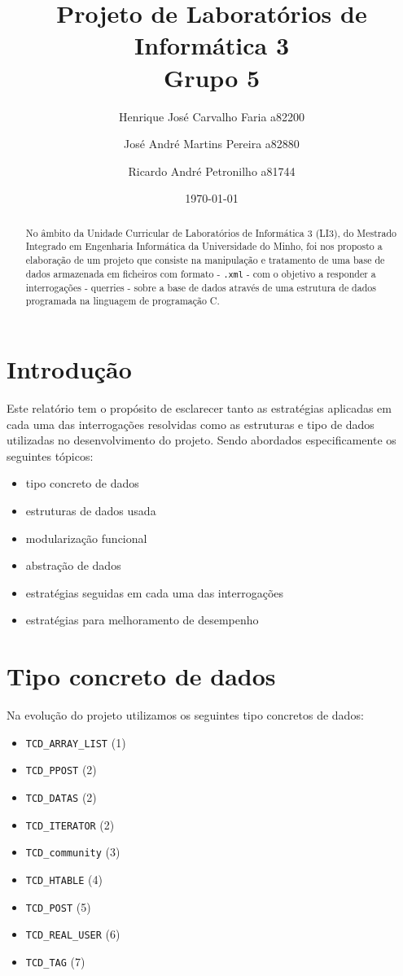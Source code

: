 \documentclass[4apaper]{report}
\title{Projeto de Laboratórios de Informática 3\\Grupo 5}
\author{Henrique José Carvalho Faria a82200\and José André Martins Pereira a82880 \and Ricardo André Petronilho a81744}
\date{\today}
\begin{document}
\maketitle
\begin{abstract}
No âmbito da Unidade Curricular de Laboratórios de Informática 3 (LI3), do Mestrado Integrado  em Engenharia Informática da Universidade do Minho, foi nos proposto a elaboração de um projeto que consiste na manipulação e tratamento de uma base de dados armazenada em ficheiros com formato - \texttt{.xml} - com o objetivo a responder a interrogações - querries - sobre a base de dados através de uma estrutura de dados programada na linguagem de programação C.
\end{abstract}

\tableofcontents

\newpage
\section{Introdução}

\label{sec:introducao}
Este relatório tem o propósito de esclarecer tanto as estratégias aplicadas em cada uma das interrogações resolvidas como as estruturas e tipo de dados utilizadas no desenvolvimento do projeto. Sendo abordados especificamente os seguintes tópicos:

\begin{itemize}
	\item tipo concreto de dados
	\item estruturas de dados usada
	\item modularização funcional
	\item abstração de dados
	\item estratégias seguidas em cada uma das interrogações
	\item estratégias para melhoramento de desempenho
\end{itemize}

\newpage
\section{Tipo concreto de dados}

\label{sec:tipoConcretoDeDados}
Na evolução do projeto utilizamos os seguintes tipo concretos de dados:

\begin{itemize}
	\item \texttt{TCD\_ARRAY\_LIST}    (1)
	\item \texttt{TCD\_PPOST}          (2)
	\item \texttt{TCD\_DATAS}          (2)
	\item \texttt{TCD\_ITERATOR} 	   (2) 
	\item \texttt{TCD\_community}      (3)
	\item \texttt{TCD\_HTABLE}         (4)
	\item \texttt{TCD\_POST}    	   (5)
	\item \texttt{TCD\_REAL\_USER}     (6)
	\item \texttt{TCD\_TAG}			   (7)
\end{itemize}
\end{document}
